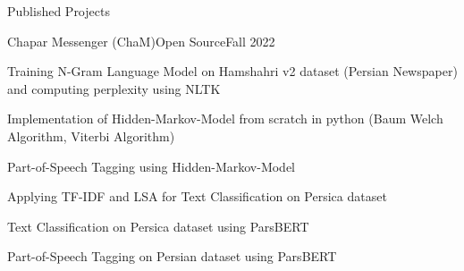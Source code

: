 \documentclass[]{main}
\begin{document}
\begin{section}{Published Projects}
 \begin{subsection}{Chapar Messenger (ChaM)}{Open Source}{Fall 2022}{}
     \item Training N-Gram Language Model on Hamshahri v2 dataset (Persian Newspaper) and computing perplexity using NLTK \;\href{https://github.com/ckoliber/nlpexercises/blob/main/src/exercise1.ipynb}{\faExternalLink*}
     \item Implementation of Hidden-Markov-Model from scratch in python (Baum Welch Algorithm, Viterbi Algorithm) \;\href{https://github.com/ckoliber/nlpexercises/blob/main/src/hmm/hmm.py}{\faExternalLink*}
     \item Part-of-Speech Tagging using Hidden-Markov-Model \;\href{https://github.com/ckoliber/nlpexercises/blob/main/src/exercise3.ipynb}{\faExternalLink*}
     \item Applying TF-IDF and LSA for Text Classification on Persica dataset \;\href{https://github.com/ckoliber/nlpexercises/blob/main/src/exercise4.ipynb}{\faExternalLink*}
     \item Text Classification on Persica dataset using ParsBERT \;\href{https://github.com/ckoliber/nlpexercises/blob/main/src/exercise5.ipynb}{\faExternalLink*}
     \item Part-of-Speech Tagging on Persian dataset using ParsBERT \;\href{https://github.com/ckoliber/nlpexercises/blob/main/src/exercise6.ipynb}{\faExternalLink*}
 \end{subsection}
\end{section}


\end{document}
